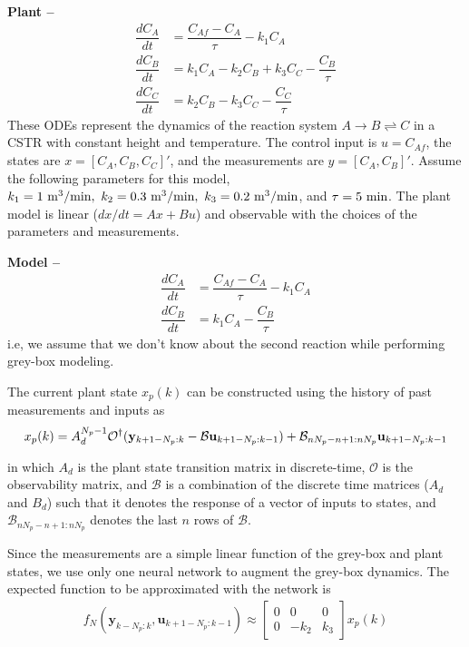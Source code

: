 \documentclass{article}
\begin{document}
\textbf{Plant --}
\begin{align*}
  \dfrac{dC_A}{dt} &= \dfrac{C_{Af} - C_A}{\tau} - k_1C_A\\
  \dfrac{dC_B}{dt} &= k_1C_A - k_2C_B + k_3C_C- \dfrac{C_B}{\tau}\\
  \dfrac{dC_C}{dt} &= k_2C_B - k_3C_C - \dfrac{C_C}{\tau}
\end{align*}
These ODEs represent the dynamics of the reaction system
$A \rightarrow B \rightleftharpoons C$ in a CSTR with constant 
height and temperature. The control input is $u = C_{Af}$,
the states are $x = [C_A, C_B, C_C]'$, 
and the measurements are $y = [C_A, C_B]'$. 
Assume the following 
parameters for this model, $k_1 = 1 \ \textnormal{m}^3/\textnormal{min}, 
\ k_2 = 0.3 \ \textnormal{m}^3/\textnormal{min},
\ k_3 = 0.2 \ \textnormal{m}^3/\textnormal{min}$, 
and $\tau = 5 \ \textnormal{min}$.
The plant model 
is linear ($dx/dt = Ax + Bu$) and 
observable with the choices of 
the parameters and measurements.

\textbf{Model --}
\begin{align*}
  \dfrac{dC_A}{dt} &= \dfrac{C_{Af} - C_A}{\tau} - k_1C_A\\
  \dfrac{dC_B}{dt} &= k_1C_A - \dfrac{C_B}{\tau}
\end{align*}
i.e, we assume that we don't know about the second reaction while 
performing grey-box modeling. 

The current plant state $x_p(k)$ can be constructed using the history of 
past measurements and inputs as 
\begin{equation*}
  x_p(k) = A^{N_p-1}_d
  \mathcal{O}^{\dagger}(\mathbf{y}_{k+1-N_p:k} - 
                        \mathcal{B}\mathbf{u}_{k+1-N_p:k-1}) + \\ 
      \mathcal{B}_{nN_p-n+1:nN_p}\mathbf{u}_{k+1-N_p:k-1}
\end{equation*}

in which $A_d$ is the plant state transition matrix in discrete-time, 
$\mathcal{O}$ is the observability matrix, 
and $\mathcal{B}$ is a combination of the 
discrete time matrices ($A_d$ and $B_d$) such that it 
denotes the response of a vector of inputs to states, 
and $\mathcal{B}_{nN_p-n+1:nN_p}$ denotes the last $n$
rows of $\mathcal{B}$.

Since the measurements are a simple linear function 
of the grey-box and plant states, we use only one 
neural network to 
augment the grey-box dynamics. 
The expected function 
to be approximated with the network is
\begin{align*}
  f_N(\mathbf{y}_{k-N_p:k}, \mathbf{u}_{k+1-N_p:k-1}) \approx 
  \begin{bmatrix}
  0 & 0 & 0 \\  
  0 & -k_2 & k_3 
  \end{bmatrix}x_p(k)
\end{align*}
\end{document}
